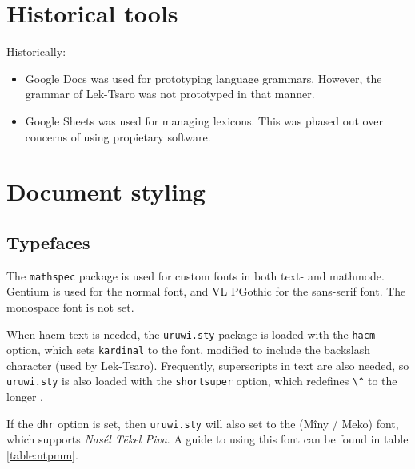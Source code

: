 \documentclass{book}
\begin{document}


\section{Historical tools}

Historically:

\begin{itemize}
  \item Google Docs was used for prototyping language grammars. However, the grammar of Lek-Tsaro was not prototyped in that manner.
  \item Google Sheets was used for managing lexicons. This was phased out over concerns of using propietary software.
\end{itemize}

\section{Document styling}

\subsection{Typefaces}

The \texttt{mathspec} package is used for custom fonts in both text- and mathmode. Gentium is used for the normal font, and \textsf{VL PGothic} for the sans-serif font. The monospace font is not set.

When hacm text is needed, the \texttt{uruwi.sty} package is loaded with the \texttt{hacm} option, which sets \texttt{\bs{}kardinal} to the  font, modified to include the backslash character (used by Lek-Tsaro). Frequently, superscripts in text are also needed, so \texttt{uruwi.sty} is also loaded with the \texttt{shortsuper} option, which redefines \verb|\^| to the longer \texttt{}.

If the \texttt{dhr} option is set, then \texttt{uruwi.sty} will also set \texttt{} to the  (Mîny / Meko) font, which supports \emph{Nasél Tēkel Piva}. A guide to using this font can be found in table \ref{table:ntpmm}.
\end{document}
